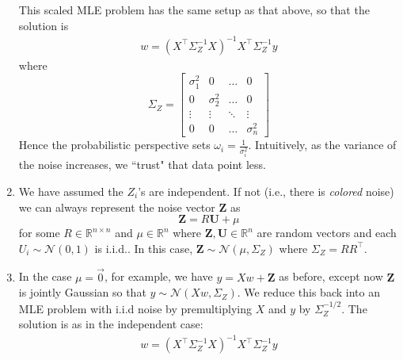 \documentclass[10pt]{article}
\begin{document}
\begin{multicols}{2}
\begin{addmargin}[0.8em]{0.5em}
\begin{enumerate}[label=(\alph*)]
        This scaled MLE problem has the same setup as that above, so that the solution is
        \begin{align*}
        w = (X^\top \Sigma_Z^{-1} X)^{-1} X^\top \Sigma_Z^{-1} y
        \end{align*}
        where 
        $$
        \Sigma_Z =
        \left[
        \begin{array}{cccc} 
        \sigma^{2}_{1} & 0 &   \ldots & 0 \\ 0 & \sigma^{2}_{2} & \ldots & 0 \\  \vdots  & \vdots & \ddots & \vdots \\ 0 & 0 & \ldots  &  \sigma^{2}_{n}
        \end{array} 
        \right]
        $$
        Hence the probabilistic perspective sets $\omega_i = \frac{1}{\sigma_i^2}$. Intuitively, as the variance of the noise increases, we ``trust" that data point less.
        
        \item We have assumed the $Z_i$'s are independent. If not (i.e., there is \textit{colored} noise) we can always represent the noise vector $\mathbf{Z}$ as
        $$
        \mathbf{Z} = R \mathbf{U} + \mu
        $$
        for some $R\in \mathbb{R}^{n\times n}$ and $\mu \in \mathbb{R}^n$ where $\mathbf{Z}, \mathbf{U} \in \mathbb{R}^n$ are random vectors and each $U_i \sim \mathcal{N}(0,1)$ is i.i.d.. In this case, $\mathbf{Z} \sim \mathcal{N}(\mu, \Sigma_Z)$ where $\Sigma_Z= RR^\top$. 
        \item In the case $\mu=\vec{0}$, for example, we have $y=Xw+\mathbf{Z}$ as before, except now $\mathbf{Z}$ is jointly Gaussian so that $y \sim \mathcal{N}(Xw, \Sigma_Z)$. We reduce this back into an MLE problem with i.i.d noise by premultiplying $X$ and $y$ by $\Sigma_Z^{-1/2}$. The solution is as in the independent case:
        \begin{align*}
        w = (X^\top \Sigma_Z^{-1} X)^{-1} X^\top \Sigma_Z^{-1} y
        \end{align*}        
    \end{enumerate}
    

\end{addmargin}
\end{multicols}
\end{document}
